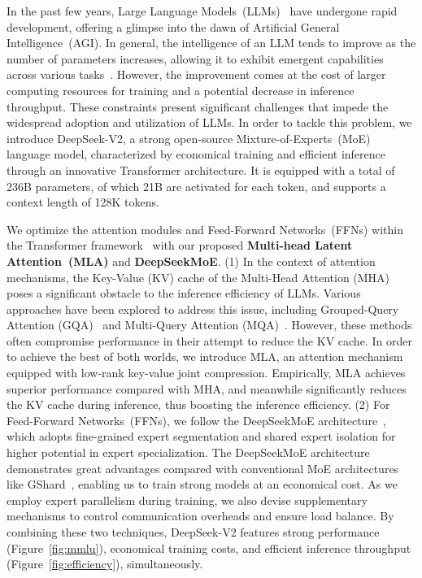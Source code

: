 \documentclass[11pt, a4paper, logo, copyright, nonumbering]{deepseek}
\newcommand{\dsvii}{DeepSeek-V2}
\newcommand{\dsattn}{MLA}
\newcommand{\dsmoe}{DeepSeekMoE}
\begin{document}
\begin{CJK*}{UTF8}{gbsn}
In the past few years, Large Language Models~(LLMs)~\citep{chatgpt,gpt4,claude,gemini} have undergone rapid development, offering a glimpse into the dawn of Artificial General Intelligence~(AGI). 
In general, the intelligence of an LLM tends to improve as the number of parameters increases, allowing it to exhibit emergent capabilities across various tasks~\citep{wei2022emergent}. 
However, the improvement comes at the cost of larger computing resources for training and a potential decrease in inference throughput. 
These constraints present significant challenges that impede the widespread adoption and utilization of LLMs.
In order to tackle this problem, we introduce \dsvii{}, a strong open-source Mixture-of-Experts~(MoE) language model, characterized by economical training and efficient inference through an innovative Transformer architecture. 
It is equipped with a total of 236B parameters, of which 21B are activated for each token, and supports a context length of 128K tokens. 

We optimize the attention modules and Feed-Forward Networks~(FFNs) within the Transformer framework~\citep{transformer} with our proposed \textbf{Multi-head Latent Attention~(\dsattn{})} and \textbf{\dsmoe{}}.
(1)
In the context of attention mechanisms, the Key-Value (KV) cache of the Multi-Head Attention (MHA)~\citep{transformer} poses a significant obstacle to the inference efficiency of LLMs. 
Various approaches have been explored to address this issue, including Grouped-Query Attention (GQA)~\citep{ainslie2023gqa} and Multi-Query Attention (MQA)~\citep{mqa}. 
However, these methods often compromise performance in their attempt to reduce the KV cache. 
In order to achieve the best of both worlds, we introduce \dsattn{}, an attention mechanism equipped with low-rank key-value joint compression. 
Empirically, \dsattn{} achieves superior performance compared with MHA, and meanwhile significantly reduces the KV cache during inference, thus boosting the inference efficiency.
(2)
For Feed-Forward Networks~(FFNs), we follow the \dsmoe{} architecture~\citep{deepseekmoe}, which adopts fine-grained expert segmentation and shared expert isolation for higher potential in expert specialization. 
The \dsmoe{} architecture demonstrates great advantages compared with conventional MoE architectures like GShard~\citep{gshard}, enabling us to train strong models at an economical cost. 
As we employ expert parallelism during training, we also devise supplementary mechanisms to control communication overheads and ensure load balance. 
By combining these two techniques, \dsvii{} features strong performance (Figure~\ref{fig:mmlu}), economical training costs, and efficient inference throughput (Figure~\ref{fig:efficiency}), simultaneously. 


\end{CJK*}
\end{document}

